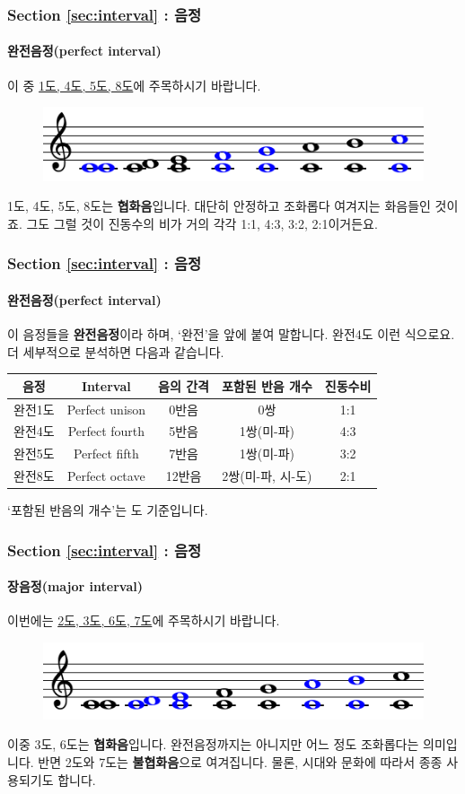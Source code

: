 \documentclass{beamer}
\begin{document}
	\begin{frame}
		\frametitle{Section \ref{sec:interval} : 음정}
		\framesubtitle{완전음정(perfect interval)}
		이 중 {\color{cyan}\href{run:res/mp3/6/interval/perfect.mp3}{1도, 4도, 5도, 8도}}에 주목하시기 바랍니다. 
		\begin{figure}
			\centering
			\includegraphics[width=\textwidth]{res/pdf/6/interval/perfect.pdf}
		\end{figure}
		1도, 4도, 5도, 8도는 {\bf 협화음}입니다. 대단히 안정하고 조화롭다 여겨지는 화음들인 것이죠. 그도 그럴 것이 진동수의 비가 거의 각각 1:1, 4:3, 3:2, 2:1이거든요.
	\end{frame}
	
	\begin{frame}
		\frametitle{Section \ref{sec:interval} : 음정}
		\framesubtitle{완전음정(perfect interval)}
		이 음정들을 {\bf 완전음정}이라 하며, `완전'을 앞에 붙여 말합니다. 완전4도 이런 식으로요. 더 세부적으로 분석하면 다음과 같습니다.
		\begin{table}[!h]
			\centering
			\small
			\begin{tabular}{|c|c|c|c|c|}
				\hline
				음정 & Interval & 음의 간격 & 포함된 반음 개수 & 진동수비 \\ \hline
				완전1도  &  Perfect unison  &  0반음  &  0쌍  &  1:1  \\ \hline
				완전4도  &  Perfect fourth  &  5반음  &  1쌍(미-파)  &  4:3  \\ \hline
				완전5도  &  Perfect fifth  &  7반음  &  1쌍(미-파)  &  3:2  \\ \hline
				완전8도  &  Perfect octave & 12반음  &  2쌍(미-파, 시-도)  &  2:1  \\ \hline
			\end{tabular}
		\end{table}
		`포함된 반음의 개수'는 도 기준입니다.
	\end{frame}
	
	\begin{frame}
		\frametitle{Section \ref{sec:interval} : 음정}
		\framesubtitle{장음정(major interval)}
		이번에는 {\color{orange}\href{run:res/mp3/6/interval/major.mp3}{2도, 3도, 6도, 7도}}에 주목하시기 바랍니다. 
		\begin{figure}
			\centering
			\includegraphics[width=\textwidth]{res/pdf/6/interval/major.pdf}
		\end{figure}
		이중 3도, 6도는 {\bf 협화음}입니다. 완전음정까지는 아니지만 어느 정도 조화롭다는 의미입니다. 반면 2도와 7도는 {\bf 불협화음}으로 여겨집니다. 물론, 시대와 문화에 따라서 종종 사용되기도 합니다.
	\end{frame}
	
\end{document}
